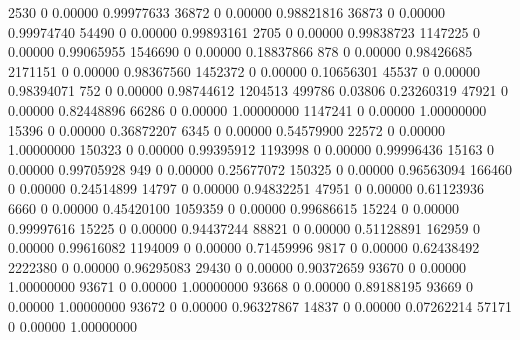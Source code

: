 \documentclass{article}
\begin{document}
\begin{Schunk}
\begin{Soutput}
2530                     0           0.00000     0.99977633
36872                    0           0.00000     0.98821816
36873                    0           0.00000     0.99974740
54490                    0           0.00000     0.99893161
2705                     0           0.00000     0.99838723
1147225                  0           0.00000     0.99065955
1546690                  0           0.00000     0.18837866
878                      0           0.00000     0.98426685
2171151                  0           0.00000     0.98367560
1452372                  0           0.00000     0.10656301
45537                    0           0.00000     0.98394071
752                      0           0.00000     0.98744612
1204513             499786           0.03806     0.23260319
47921                    0           0.00000     0.82448896
66286                    0           0.00000     1.00000000
1147241                  0           0.00000     1.00000000
15396                    0           0.00000     0.36872207
6345                     0           0.00000     0.54579900
22572                    0           0.00000     1.00000000
150323                   0           0.00000     0.99395912
1193998                  0           0.00000     0.99996436
15163                    0           0.00000     0.99705928
949                      0           0.00000     0.25677072
150325                   0           0.00000     0.96563094
166460                   0           0.00000     0.24514899
14797                    0           0.00000     0.94832251
47951                    0           0.00000     0.61123936
6660                     0           0.00000     0.45420100
1059359                  0           0.00000     0.99686615
15224                    0           0.00000     0.99997616
15225                    0           0.00000     0.94437244
88821                    0           0.00000     0.51128891
162959                   0           0.00000     0.99616082
1194009                  0           0.00000     0.71459996
9817                     0           0.00000     0.62438492
2222380                  0           0.00000     0.96295083
29430                    0           0.00000     0.90372659
93670                    0           0.00000     1.00000000
93671                    0           0.00000     1.00000000
93668                    0           0.00000     0.89188195
93669                    0           0.00000     1.00000000
93672                    0           0.00000     0.96327867
14837                    0           0.00000     0.07262214
57171                    0           0.00000     1.00000000

\end{Soutput}
\end{Schunk}
\end{document}
